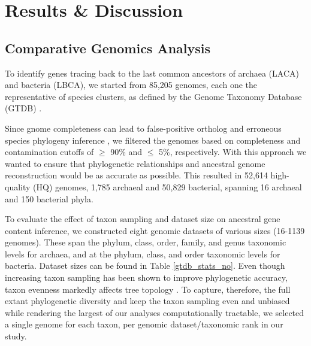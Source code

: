 \section{Results \& Discussion}

\subsection*{Comparative Genomics Analysis}

\normalsize

To identify genes tracing back to the last common ancestors of archaea (LACA) and bacteria (LBCA), we started from 85,205 genomes, each one the representative of species clusters, as defined by the Genome Taxonomy Database (GTDB) \cite{parks2018, parks2020, parks2022, rinke2021}. 

Since gnome completeness can lead to false-positive ortholog and erroneous species phylogeny inference \cite{kuzniar2008}, we filtered the genomes based on completeness and contamination cutoffs of $\geq$ 90\% and $\leq$ 5\%, respectively. With this approach we wanted to ensure that phylogenetic relationships and ancestral genome reconstruction would be as accurate as possible. This resulted in 52,614 high-quality (HQ) genomes, 1,785 archaeal and 50,829 bacterial, spanning 16 archaeal and 150 bacterial phyla. 

To evaluate the effect of taxon sampling and dataset size on ancestral gene content inference, we constructed eight genomic datasets of various sizes (16-1139 genomes). These span the phylum, class, order, family, and genus taxonomic levels for archaea, and at the phylum, class, and order taxonomic levels for bacteria. Dataset sizes can be found in Table \ref{gtdb_stats_no}. Even though increasing taxon sampling has been shown to improve phylogenetic accuracy, taxon evenness markedly affects tree topology \cite{graybeal1998, martinez-gutierrez2021}. To capture, therefore, the full extant phylogenetic diversity and keep the taxon sampling even and unbiased while rendering the largest of our analyses computationally tractable, we selected a single genome for each taxon, per genomic dataset/taxonomic rank in our study.

